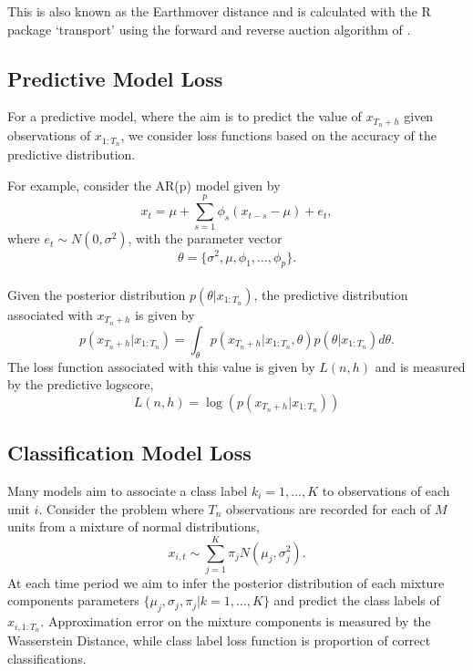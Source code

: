 \documentclass[12pt,a4paper]{article}\usepackage[]{graphicx}\usepackage[]{color}
\begin{document}
This is also known as the Earthmover distance and is calculated with the R package `transport' \citep{transport} using the forward and reverse auction algorithm of \citet{Bertsekas1992}.

\subsection{Predictive Model Loss}

For a predictive model, where the aim is to predict the value of $x_{T_n + h}$ given observations of $x_{1:T_n}$, we consider loss functions based on the accuracy of the predictive distribution.

For example, consider the AR(p) model given by
\begin{equation}
x_t = \mu + \sum_{s=1}^p \phi_s (x_{t-s} - \mu) + e_t,
\end{equation}
where $e_t \sim N(0, \sigma^2)$, with the parameter vector
\begin{equation}
\theta = \{\sigma^2, \mu, \phi_1, \dots, \phi_p \}.
\end{equation}
\\

Given the posterior distribution $p(\theta | x_{1:T_n})$, the predictive distribution associated with $x_{T_n +h}$ is given by
\begin{equation}
\label{forecastDist}
p(x_{T_n + h} | x_{1:T_n}) = \int_{\theta} p(x_{T_n + h} | x_{1:T_n}, \theta)p(\theta | x_{1:T_n})d\theta.
\end{equation}
The loss function associated with this value is given by $L(n, h)$ and is measured by the predictive logscore,
\begin{equation}
\label{loss:logscore}
L(n, h) = \log(p(x_{T_n + h} | x_{1:T_n}))
\end{equation}

\subsection{Classification Model Loss}

Many models aim to associate a class label $k_i = 1 , \dots, K$ to observations of each unit $i$. Consider the problem where $T_n$ observations are recorded for each of $M$ units from a mixture of normal distributions,
\begin{equation}
\label{mixNormalDGP}
x_{i, t} \sim \sum_{j=1}^K \pi_{j} N(\mu_j, \sigma^2_{j}).
\end{equation}
At each time period we aim to infer the posterior distribution of each mixture components parameters $\{\mu_j, \sigma_j, \pi_j | k = 1, \dots, K\}$ and predict the class labels of $x_{i, 1:T_n}$. Approximation error on the mixture components is measured by the Wasserstein Distance, while class label loss function is proportion of correct classifications.
\end{document}
